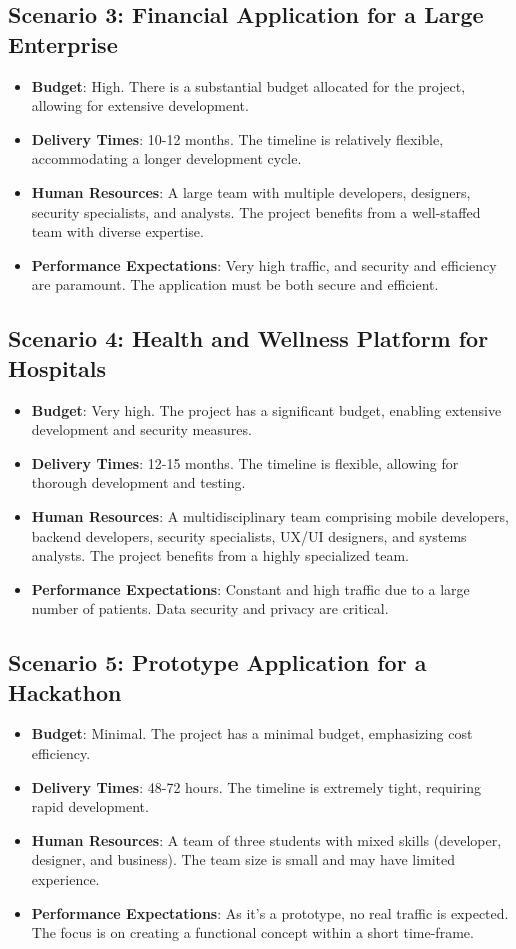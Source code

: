 \subsection*{Scenario 3: Financial Application for a Large Enterprise}
\begin{itemize}
	\item \textbf{Budget}: High. There is a substantial budget allocated for the project, allowing for extensive development.
	\item \textbf{Delivery Times}: 10-12 months. The timeline is relatively flexible, accommodating a longer development cycle.
	\item \textbf{Human Resources}: A large team with multiple developers, designers, security specialists, and analysts. The project benefits from a well-staffed team with diverse expertise.
	\item \textbf{Performance Expectations}: Very high traffic, and security and efficiency are paramount. The application must be both secure and efficient.
\end{itemize}

\subsection*{Scenario 4: Health and Wellness Platform for Hospitals}
\begin{itemize}
	\item \textbf{Budget}: Very high. The project has a significant budget, enabling extensive development and security measures.
	\item \textbf{Delivery Times}: 12-15 months. The timeline is flexible, allowing for thorough development and testing.
	\item \textbf{Human Resources}: A multidisciplinary team comprising mobile developers, backend developers, security specialists, UX/UI designers, and systems analysts. The project benefits from a highly specialized team.
	\item \textbf{Performance Expectations}: Constant and high traffic due to a large number of patients. Data security and privacy are critical.
\end{itemize}

\subsection*{Scenario 5: Prototype Application for a Hackathon}
\begin{itemize}
	\item \textbf{Budget}: Minimal. The project has a minimal budget, emphasizing cost efficiency.
	\item \textbf{Delivery Times}: 48-72 hours. The timeline is extremely tight, requiring rapid development.
	\item \textbf{Human Resources}: A team of three students with mixed skills (developer, designer, and business). The team size is small and may have limited experience.
	\item \textbf{Performance Expectations}: As it's a prototype, no real traffic is expected. The focus is on creating a functional concept within a short time-frame.
\end{itemize}


